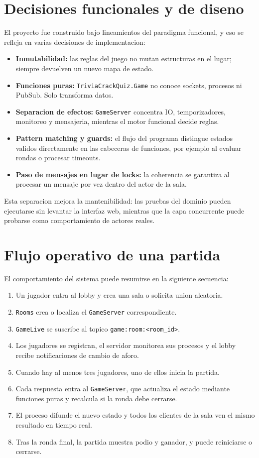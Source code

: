 \documentclass[12pt,a4paper]{article}
\begin{document}
\section{Decisiones funcionales y de diseno}

El proyecto fue construido bajo lineamientos del paradigma funcional, y eso se
refleja en varias decisiones de implementacion:

\begin{itemize}
  \item \textbf{Inmutabilidad:} las reglas del juego no mutan estructuras en el
  lugar; siempre devuelven un nuevo mapa de estado.
  \item \textbf{Funciones puras:} \texttt{TriviaCrackQuiz.Game} no conoce
  sockets, procesos ni PubSub. Solo transforma datos.
  \item \textbf{Separacion de efectos:} \texttt{GameServer} concentra IO,
  temporizadores, monitoreo y mensajeria, mientras el motor funcional decide
  reglas.
  \item \textbf{Pattern matching y guards:} el flujo del programa distingue
  estados validos directamente en las cabeceras de funciones, por ejemplo al
  evaluar rondas o procesar timeouts.
  \item \textbf{Paso de mensajes en lugar de locks:} la coherencia se garantiza
  al procesar un mensaje por vez dentro del actor de la sala.
\end{itemize}

Esta separacion mejora la mantenibilidad: las pruebas del dominio pueden
ejecutarse sin levantar la interfaz web, mientras que la capa concurrente puede
probarse como comportamiento de actores reales.

\section{Flujo operativo de una partida}

El comportamiento del sistema puede resumirse en la siguiente secuencia:

\begin{enumerate}
  \item Un jugador entra al lobby y crea una sala o solicita union aleatoria.
  \item \texttt{Rooms} crea o localiza el \texttt{GameServer} correspondiente.
  \item \texttt{GameLive} se suscribe al topico \texttt{game:room:<room\_id>}.
  \item Los jugadores se registran, el servidor monitorea sus procesos y el
  lobby recibe notificaciones de cambio de aforo.
  \item Cuando hay al menos tres jugadores, uno de ellos inicia la partida.
  \item Cada respuesta entra al \texttt{GameServer}, que actualiza el estado
  mediante funciones puras y recalcula si la ronda debe cerrarse.
  \item El proceso difunde el nuevo estado y todos los clientes de la sala ven
  el mismo resultado en tiempo real.
  \item Tras la ronda final, la partida muestra podio y ganador, y puede
  reiniciarse o cerrarse.
\end{enumerate}
\end{document}
